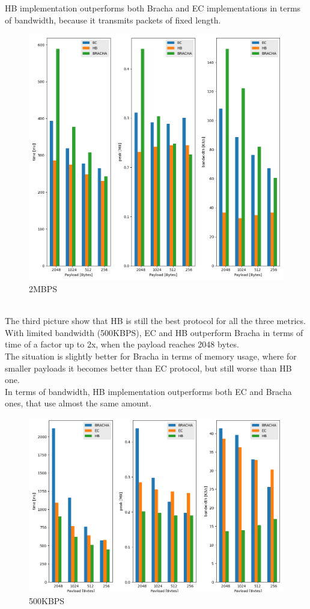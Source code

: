 \documentclass[12pt]{article}
\begin{document}
HB implementation outperforms both Bracha and EC implementations in terms of bandwidth, because it transmits packets of fixed length.\\
\begin{figure}
\centering
\includegraphics[scale=0.4]{BAR-GRAPH-3FINAL-2MBPS.png}
\caption{2MBPS}
\label{fig:mesh2}
\end{figure}
\\
The third picture show that HB is still the best protocol for all the three metrics. With limited bandwidth (500KBPS), EC and HB outperform Bracha in terms of time of a factor up to 2x, when the payload reaches 2048 bytes. \\
The situation is slightly better for Bracha in terms of memory usage, where for smaller payloads it becomes better than EC protocol, but still worse than HB one.\\
In terms of bandwidth, HB implementation outperforms both EC and Bracha ones, that use almost the same amount.\\ 
\begin{figure}
\centering
\includegraphics[scale=0.4]{BAR-BW-500KB-20-proc.png}
\caption{500KBPS}
\label{fig:mesh3}
\end{figure}
\end{document}
